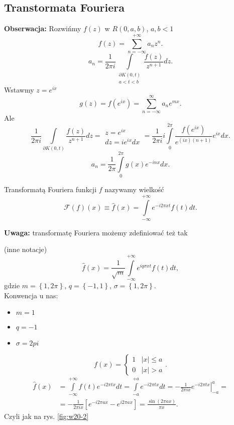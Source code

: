 \documentclass[../main.tex]{subfiles}
\begin{document}
\subsection{Transtormata Fouriera}
\textbf{Obserwacja:} Rozwińmy $f(z)$ w $R(0,a,b)$, $a,b < 1$
\[
    f(z) = \sum_{n=-\infty}^{+\infty} a_nz^n
.\]
\[
    a_n = \frac{1}{2\pi i}\int\limits_{\substack{\partial K(0,t)\\ a < t < b}}\frac{f(z)}{z^{n+1}}dz
.\]
Wstawmy $z = e^{ix}$
 \[
     g(z) = f\left(e^{ix}\right) = \sum_{n=-\infty}^{\infty} a_n e^{mx}
 .\]
 Ale
 \[
     \frac{1}{2\pi i} \int\limits_{\partial K(0,t)}\frac{f(z)}{z^{n+1}}dz = \begin{matrix} z = e^{ix}\\ dz = ie^{ix}dx\end{matrix} = \frac{1}{2\pi i}i \int\limits_{0}^{2\pi} \frac{f\left( e^{ix} \right) }{e^{(ix)(n+1)}}e^{ix}dx
 .\]
 \[
     a_n = \frac{1}{2\pi}\int\limits_{0}^{2\pi}g(x)e^{-inx}dx
 .\]
 \begin{definicja}
     Transformatą Fouriera funkcji $f$ nazywamy wielkość
     \[
         \mathcal{F}(f)(x) \equiv \hat{f}(x) = \int\limits_{-\infty}^{+\infty} e^{-i2\pi xt}f(t)dt
     .\]
 \end{definicja}
 \textbf{Uwaga: }transformatę Fouriera możemy zdefiniować też tak
 \begin{definicja}
     (inne notacje)
     \[
         \hat{f}(x) = \frac{1}{\sqrt{m} }\int\limits_{-\infty}^{+\infty}e^{iq\sigma xt}f(t)dt
     ,\]
 gdzie $m = \left\{ 1,2\pi \right\} $, $q = \left\{ -1, 1 \right\} $, $\sigma = \left\{ 1,2\pi \right\} $.\\
     Konwencja u nas:
     \begin{itemize}
         \item $m = 1 $
         \item $q = - 1$
         \item $\sigma = 2pi$
     \end{itemize}
 \end{definicja}
 \begin{przyklad}
     \[
         f(x) = \begin{cases}
             1&|x|\le a\\ 0 & |x| > a
         \end{cases}
     .\]
 \begin{align*}
     \hat{f}(x) &= \int\limits_{-\infty}^{+\infty}f(t)e^{-i 2\pi t x}dt = \int\limits_{-a}^{+a}e^{-i 2\pi tx}dt = \left.-\frac{1}{2\pi i x}e^{-i 2 \pi t x}\right|_{-a}^{a} =\\
     &= -\frac{1}{2\pi i x}\left[ e^{-i 2 \pi a x} - e^{i 2 \pi a x} \right] = \frac{\sin(2\pi a x)}{\pi x}
 .\end{align*}
 Czyli jak na rys. \ref{fig:w20-2}
 \end{przyklad}
\end{document}
